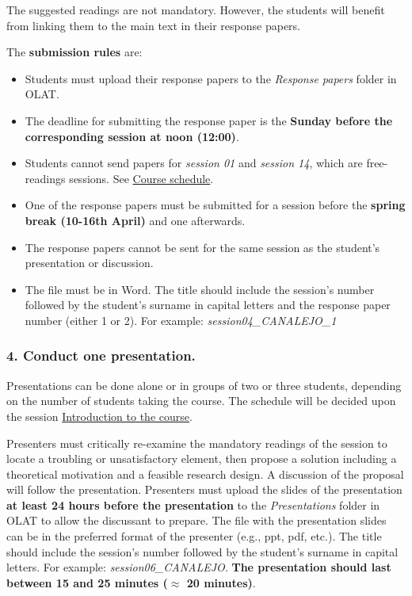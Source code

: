 \documentclass[
  12pt,
]{article}
\begin{document}
The suggested readings are not mandatory. However, the students will
benefit from linking them to the main text in their response papers.

The \textbf{submission rules} are:

\begin{itemize}
\item
  Students must upload their response papers to the \emph{Response
  papers} folder in OLAT.
\item
  The deadline for submitting the response paper is the \textbf{Sunday
  before the corresponding session at noon (12:00)}.
\item
  Students cannot send papers for \emph{session 01} and \emph{session
  14}, which are free-readings sessions. See
  \protect\hyperlink{course-schedule}{Course schedule}.
\item
  One of the response papers must be submitted for a session before the
  \textbf{spring break (10-16th April)} and one afterwards.
\item
  The response papers cannot be sent for the same session as the
  student's presentation or discussion.
\item
  The file must be in Word. The title should include the session's
  number followed by the student's surname in capital letters and the
  response paper number (either 1 or 2). For example:
  \emph{session04\_CANALEJO\_1}
\end{itemize}

\hypertarget{conduct-one-presentation.}{%
\subsubsection{4. Conduct one
presentation.}\label{conduct-one-presentation.}}

Presentations can be done alone or in groups of two or three students,
depending on the number of students taking the course. The schedule will
be decided upon the session
\protect\hyperlink{introduction-to-the-course}{Introduction to the
course}.

Presenters must critically re-examine the mandatory readings of the
session to locate a troubling or unsatisfactory element, then propose a
solution including a theoretical motivation and a feasible research
design. A discussion of the proposal will follow the presentation.
Presenters must upload the slides of the presentation \textbf{at least
24 hours before the presentation} to the \emph{Presentations} folder in
OLAT to allow the discussant to prepare. The file with the presentation
slides can be in the preferred format of the presenter (e.g., ppt, pdf,
etc.). The title should include the session's number followed by the
student's surname in capital letters. For example:
\emph{session06\_CANALEJO}. \textbf{The presentation should last between
15 and 25 minutes (\(\approx\) 20 minutes)}.
\end{document}
